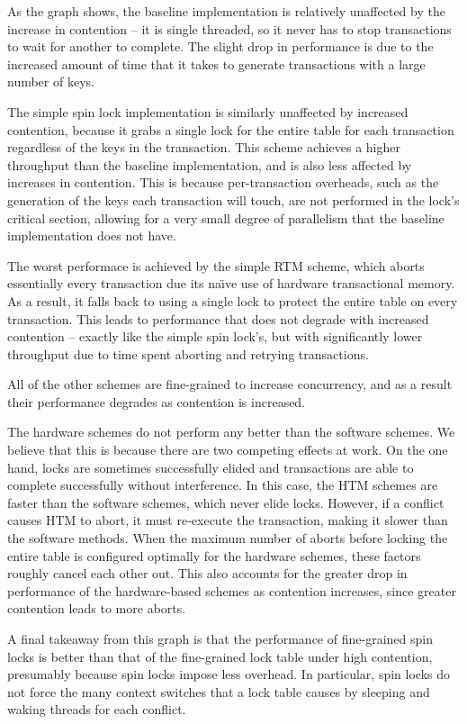 As the graph shows, the baseline implementation is relatively unaffected by the
increase in contention -- it is single threaded, so it never has to stop
transactions to wait for another to complete. The slight drop in performance is
due to the increased amount of time that it takes to generate transactions with
a large number of keys.

The simple spin lock implementation is similarly unaffected by increased
contention, because it grabs a single lock for the entire table for each
transaction regardless of the keys in the transaction. This scheme achieves a
higher throughput than the baseline implementation, and is also less affected by
increases in contention. This is because per-transaction overheads, such as
the generation of the keys each transaction will touch, are not performed in the
lock's critical section, allowing for a very small degree of parallelism that
the baseline implementation does not have.

The worst performace is achieved by the simple RTM scheme, which aborts
essentially every transaction due its na\"{\i}ve use of hardware transactional
memory.  As a result, it falls back to using a single lock to protect the entire
table on every transaction. This leads to performance that does not degrade with
increased contention -- exactly like the simple spin lock's, but with
significantly lower throughput due to time spent aborting and retrying
transactions.

All of the other schemes are fine-grained to increase concurrency, and as a
result their performance degrades as contention is increased.

The hardware schemes do not perform any better than the software schemes. We
believe that this is because there are two competing effects at work. On the one
hand, locks are sometimes successfully elided and transactions are able to
complete successfully without interference. In this case, the HTM schemes are
faster than the software schemes, which never elide locks.  However, if a
conflict causes HTM to abort, it must re-execute the transaction, making it
slower than the software methods. When the maximum number of aborts before
locking the entire table is configured optimally for the hardware schemes, these
factors roughly cancel each other out. This also accounts for the greater drop
in performance of the hardware-based schemes as contention increases, since
greater contention leads to more aborts.

A final takeaway from this graph is that the performance of fine-grained spin
locks is better than that of the fine-grained lock table under high contention,
presumably because spin locks impose less overhead. In particular, spin locks do
not force the many context switches that a lock table causes by sleeping and
waking threads for each conflict.

